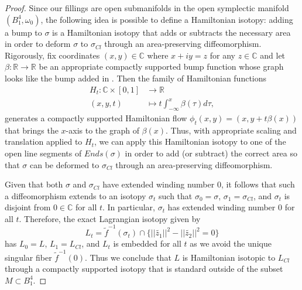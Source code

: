 \documentclass[10pt]{amsart}
\theoremstyle{plain}
\theoremstyle{definition}
\numberwithin{equation}{section}
\newcommand{\R}{\mathbb{R}}
\newcommand{\C}{\mathbb{C}}
\newcommand{\sse}{\subset}
\newcommand{\wt}{\widetilde}
\begin{document}
\begin{proof}
Since our fillings are open submanifolds in the open symplectic manifold $(B^4_1,\omega_0)$, the following idea is possible to define a Hamiltonian isotopy: adding a bump to $\sigma$ is a Hamiltonian isotopy that adds or subtracts the necessary area in order to deform $\sigma$ to $\sigma_{Cl}$ through an area-preserving diffeomorphism. Rigorously, fix coordinates $(x,y)\in \C$ where $x+iy=z$ for any $z\in\C$ and let $\beta:\R\to \R$ be an appropriate compactly supported bump function whose graph looks like the bump added in . Then the family of Hamiltonian functions
\begin{align*}
H_t:\C\times [0,1]&\to \R\\
(x,y,t)&\mapsto t\int_{-\infty}^x \beta(\tau)d\tau,
\end{align*}
generates a compactly supported Hamiltonian flow $\phi_t(x,y) = (x,y+t\beta(x))$ that brings the $x$-axis to the graph of $\beta(x)$. Thus, with appropriate scaling and translation applied to $H_t$, we can apply this Hamiltonian isotopy to one of the open line segments of $Ends(\sigma)$ in order to add (or subtract) the correct area so that $\sigma$ can be deformed to $\sigma_{Cl}$ through an area-preserving diffeomorphism.

Given that both $\sigma$ and $\sigma_{Cl}$ have extended winding number $0$, it follows that such a diffeomorphism extends to an isotopy $\sigma_t$ such that $\sigma_0=\sigma$, $\sigma_1=\sigma_{Cl}$, and $\sigma_t$ is disjoint from $0\in \C$ for all $t$. In particular, $\sigma_t$ has extended winding number $0$ for all $t$. Therefore, the exact Lagrangian isotopy given by 
$$L_t = \tilde{f}^{-1}(\sigma_t)\cap \{||\wt{z_1}||^2-||\wt{z_2}||^2=0\}$$ 
has $L_0=L$, $L_1=L_{Cl}$, and $L_t$ is embedded for all $t$ as we avoid the unique singular fiber $\tilde{f}^{-1}(0)$. Thus we conclude that $L$ is Hamiltonian isotopic to $L_{Cl}$ through a compactly supported isotopy that is standard outside of the subset $M\sse B^4_1$.
\end{proof}
\end{document}
